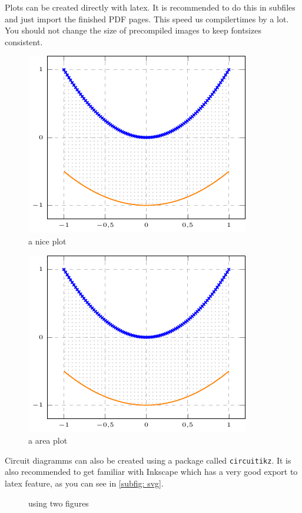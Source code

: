 \documentclass[	%
		11pt,a4paper,	%
		twoside,		%
		english,		%
		f1				%
	]{HsH-report}		%
\begin{document}
	Plots can be created directly with latex. It is recommended to do this in subfiles and just import the finished PDF pages. This speed us
	compilertimes by a lot. You should not change the size of precompiled images to keep fontsizes consistent.
	\pagebreak
	\begin{figure}
		\includegraphics[page=2]{plt/examplePlot.pdf}
		\caption[centering]{a nice plot}
		\label{fig: plot1}
	\end{figure}
	\begin{figure}
		\includegraphics[page=1]{plt/examplePlot.pdf}
		\caption{a area plot}
		\label{fig: area}
	\end{figure}

	Circuit diagramms can also be created using a package called \lstinline{circuitikz}. It is also recommended to get familiar with Inkscape which
	has a very good export to latex feature, as you can see in \autoref{subfig: svg}.
	\begin{figure}
		\graphicspath{{svg/build/}} %
		\hspace{2cm}
		\caption{using two figures}
	\end{figure}
\end{document}
